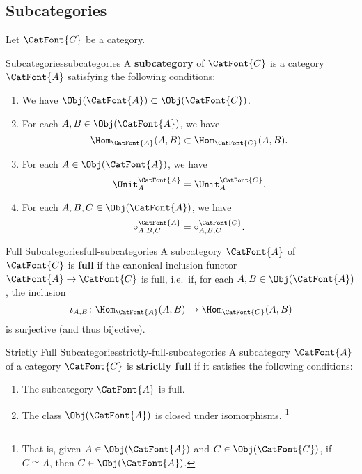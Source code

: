 \subsection{Subcategories}\label{subsection-subcategories}
Let $\CatFont{C}$ be a category.
\begin{definition}{Subcategories}{subcategories}%
    A \textbf{subcategory} of $\CatFont{C}$ is a category $\CatFont{A}$ satisfying the following conditions:
    \begin{enumerate}
        \item{}We have $\Obj(\CatFont{A})\subset\Obj(\CatFont{C})$.
        \item{}For each $A,B\in\Obj(\CatFont{A})$, we have
            \[
                \Hom_{\CatFont{A}}(A,B)
                \subset
                \Hom_{\CatFont{C}}(A,B).
            \]
        \item{}For each $A\in\Obj(\CatFont{A})$, we have
            \[
                \Unit^{\CatFont{A}}_{A}
                =
                \Unit^{\CatFont{C}}_{A}.
            \]%
        \item{}For each $A,B,C\in\Obj(\CatFont{A})$, we have
            \[
                \circ^{\CatFont{A}}_{A,B,C}
                =
                \circ^{\CatFont{C}}_{A,B,C}.
            \]%
    \end{enumerate}
\end{definition}
\begin{definition}{Full Subcategories}{full-subcategories}%
    A subcategory $\CatFont{A}$ of $\CatFont{C}$ is \textbf{full} if the canonical inclusion functor $\CatFont{A}\to\CatFont{C}$ is full, i.e.\ if, for each $A,B\in\Obj(\CatFont{A})$, the inclusion
    \[
        \iota_{A,B}%
        \colon%
        \Hom_{\CatFont{A}}(A,B)%
        \hookrightarrow%
        \Hom_{\CatFont{C}}(A,B)%
    \]%
    is surjective (and thus bijective).
\end{definition}
\begin{definition}{Strictly Full Subcategories}{strictly-full-subcategories}%
    A subcategory $\CatFont{A}$ of a category $\CatFont{C}$ is \textbf{strictly full} if it satisfies the following conditions:
    \begin{enumerate}
        \item{}The subcategory $\CatFont{A}$ is full.
        \item{}The class $\Obj(\CatFont{A})$ is closed under isomorphisms.%
            \footnote{%
                That is, given $A\in\Obj(\CatFont{A})$ and $C\in\Obj(\CatFont{C})$, if $C\cong A$, then $C\in\Obj(\CatFont{A})$.%
                \par\vspace*{\TCBBoxCorrection}
            }%
    \end{enumerate}
\end{definition}
